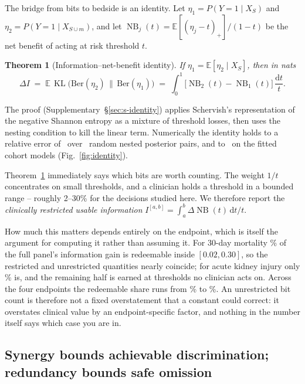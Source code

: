\documentclass[11pt]{article}
\newtheorem{theorem}{Theorem}
\theoremstyle{definition}
\theoremstyle{remark}
\DeclareMathOperator{\KL}{KL}
\DeclareMathOperator{\NB}{NB}
\begin{document}
The bridge from bits to bedside is an identity. Let $\eta_1 = P(Y=1\mid X_S)$ and
$\eta_2 = P(Y=1\mid X_{S\cup m})$, and let $\NB_j(t) = \mathbb{E}[(\eta_j-t)_+]/(1-t)$
be the net benefit of acting at risk threshold $t$.

\begin{theorem}[Information--net-benefit identity]
\label{thm:identity}
If $\eta_1 = \mathbb{E}[\eta_2\mid X_S]$, then in nats
\[
\Delta I \;=\; \mathbb{E}\,\KL\!\big(\mathrm{Ber}(\eta_2)\,\|\,\mathrm{Ber}(\eta_1)\big)
\;=\; \int_0^1 \big[\NB_2(t)-\NB_1(t)\big]\,\frac{\mathrm{d}t}{t}.
\]
\end{theorem}

The proof (Supplementary~\S\ref{sec:s-identity}) applies Schervish's representation of the negative
Shannon entropy as a mixture of threshold losses, then uses the nesting condition
to kill the linear term. Numerically the identity holds to a relative error of
\thyIdentityRelErr\ over \thyIdentityTrials\ random nested posterior pairs, and
to \primaryIdentityRelErr\ on the fitted cohort models
(Fig.~\ref{fig:identity}).

Theorem~\ref{thm:identity} immediately says which bits are worth counting. The
weight $1/t$ concentrates on small thresholds, and a clinician holds a threshold
in a bounded range -- roughly 2--30\% for the decisions studied here. We
therefore report the \emph{clinically restricted usable information}
$I^{[a,b]} = \int_a^b \Delta\NB(t)\,\mathrm{d}t/t$.

How much this matters depends entirely on the endpoint, which is itself the
argument for computing it rather than assuming it. For 30-day mortality
\primaryRestrictedShare\% of the full panel's information gain is redeemable
inside $[0.02,0.30]$, so the restricted and unrestricted quantities nearly
coincide; for acute kidney injury only \restrictedShareMin\% is, and the
remaining half is earned at thresholds no clinician acts on. Across the four
endpoints the redeemable share runs from \restrictedShareMin\% to
\restrictedShareMax\%. An unrestricted bit count is therefore not a fixed
overstatement that a constant could correct: it overstates clinical value by an
endpoint-specific factor, and nothing in the number itself says which case you
are in.

\subsection{Synergy bounds achievable discrimination; redundancy bounds safe omission}
\end{document}
